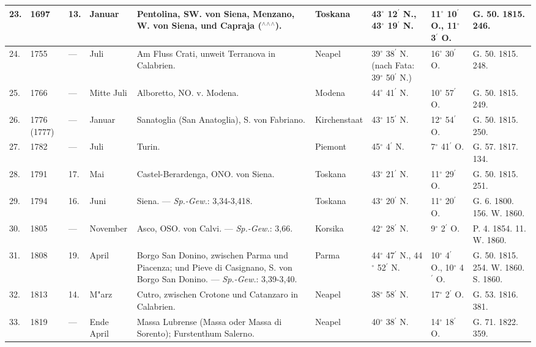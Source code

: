 \documentclass[a4paper, 8pt, oneside, polutonikogreek, german]{article}
\begin{document}
\begin{center}
\begin{longtable}{|p{3mm}|p{13mm}|p{5mm}|p{16mm}|p{25mm}|p{18mm}|p{13mm}|p{13mm}|p{13mm}|}
        23. & 1697 & 13. & Januar & Pentolina, SW. von Siena, Menzano, W. von Siena, und Capraja ($^\wedge$$^\wedge$$^\wedge$). & Toskana & 43$^\circ$ 12$^\prime$ N., 43$^\circ$ 19$^\prime$ N. & 11$^\circ$ 10$^\prime$ O., 11$^\circ$ 3$^\prime$ O. & G. 50. 1815. 246. \\ \hline
        24. & 1755 & --- & Juli & Am Fluss Crati, unweit Terranova in Calabrien. & Neapel & 39$^\circ$ 38$^\prime$ N. (nach Fata: 39$^\circ$ 50$^\prime$ N.) & 16$^\circ$ 30$^\prime$ O. & G. 50. 1815. 248. \\ \hline
        25. & 1766 & --- & Mitte Juli & Alboretto, NO. v. Modena. & Modena & 44$^\circ$ 41$^\prime$ N. & 10$^\circ$ 57$^\prime$ O. & G. 50. 1815. 249. \\ \hline
        26. & 1776 (1777) & --- & Januar & Sanatoglia (San Anatoglia), S. von Fabriano. & Kirchenstaat & 43$^\circ$ 15$^\prime$ N. & 12$^\circ$ 54$^\prime$ O. & G. 50. 1815. 250. \\ \hline
        27. & 1782 & --- & Juli & Turin. & Piemont & 45$^\circ$ 4$^\prime$ N. & 7$^\circ$ 41$^\prime$ O. & G. 57. 1817. 134. \\ \hline
        28. & 1791 & 17. & Mai & Castel-Berardenga, ONO. von Siena. & Toskana & 43$^\circ$ 21$^\prime$ N. & 11$^\circ$ 29$^\prime$ O. & G. 50. 1815. 251. \\ \hline
        29. & 1794 & 16. & Juni & Siena. --- \emph{Sp.-Gew.}: 3,34-3,418. & Toskana & 43$^\circ$ 20$^\prime$ N. & 11$^\circ$ 20$^\prime$ O. & G. 6. 1800. 156. W. 1860. \\ \hline
        30. & 1805 & --- & November & Asco, OSO. von Calvi. --- \emph{Sp.-Gew.}: 3,66. & Korsika & 42$^\circ$ 28$^\prime$ N. & 9$^\circ$ 2$^\prime$ O. & P. 4. 1854. 11. W. 1860. \\ \hline
        31. & 1808 & 19. & April & Borgo San Donino, zwischen Parma und Piacenza; und Pieve di Casignano, S. von Borgo San Donino. --- \emph{Sp.-Gew.}: 3,39-3,40. & Parma & 44$^\circ$ 47$^\prime$ N., 44$^\circ$ 52$^\prime$ N. & 10$^\circ$ 4$^\prime$ O., 10$^\circ$ 4$^\prime$ O. & G. 50. 1815. 254. W. 1860. S. 1860. \\ \hline
        32. & 1813 & 14. & M"arz & Cutro, zwischen Crotone und Catanzaro in Calabrien. & Neapel & 38$^\circ$ 58$^\prime$ N. & 17$^\circ$ 2$^\prime$ O. & G. 53. 1816. 381. \\ \hline
        33. & 1819 & --- & Ende April & Massa Lubrense (Massa oder Massa di Sorento); Furstenthum Salerno. & Neapel & 40$^\circ$ 38$^\prime$ N. & 14$^\circ$ 18$^\prime$ O. & G. 71. 1822. 359. \\ \hline

\end{longtable}
\end{center}
\end{document}

